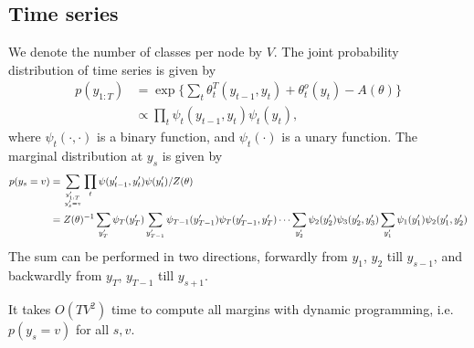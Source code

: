 \documentclass{article}
\begin{document}
\subsection{Time series}
We denote the number of classes per node by $V$. The joint probability distribution of time series is given by
\begin{align*}
p(y_{1:T})&=\exp\{\sum_{t}\theta_t^T(y_{t-1},y_t)+\theta_t^{o}(y_t)-A(\theta)\}\\
                &\propto \prod_t\psi_t(y_{t-1},y_t) \psi_t(y_t),
\end{align*}
where $\psi_t(\cdot,\cdot)$ is a binary function, and $\psi_t(\cdot)$ is a unary function. The marginal distribution at $y_s$ is given by
\begin{align*}
p(y_s=v)
&=\sum_{y'_{1:T}\atop y'_s=v}\prod_{t}\psi(y'_{t-1},y_t')\psi(y'_t)/Z(\theta)\\
&=Z(\theta)^{-1}\sum_{y_T'}\psi_T(y_T')\sum_{y_{T-1}'}\psi_{T-1}(y_{T-1}')\psi_T(y_{T-1}', y_{T}')
\cdots \sum_{y_2'}\psi_{2}(y_{2}')\psi_3(y_{2}', y_{3}')\sum_{y_1'}\psi_{1}(y_{1}')\psi_2(y_{1}', y_{2}')
\end{align*}
The sum can be performed in two directions, forwardly from $y_1$, $y_2$ till $y_{s-1}$, and backwardly from $y_T$, $y_{T-1}$ till $y_{s+1}$.
\begin{center}
\end{center}

It takes $O(TV^2)$ time to compute all margins with dynamic programming, i.e. $p(y_s=v)$ for all $s,v$.
\end{document}
